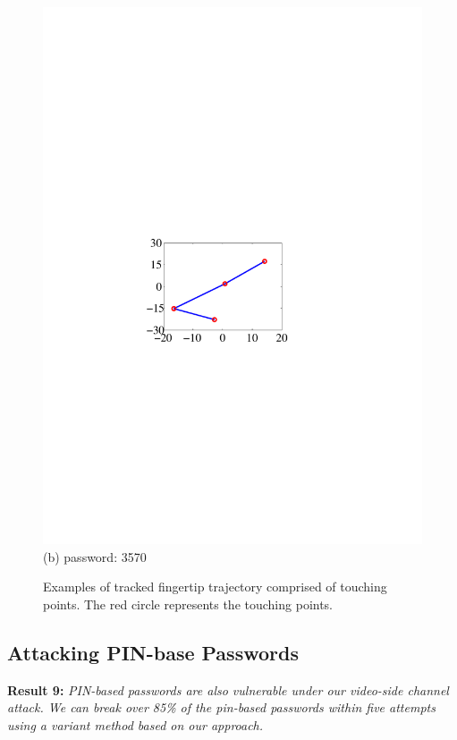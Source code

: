 \begin{figure}[!t]
{\begin{minipage}[t]{0.22\textwidth}
                \includegraphics[width=\textwidth]{fig/pin_3570.pdf}\\
                \centering  (b) password: 3570
             \end{minipage}
        }
        \caption{Examples of tracked fingertip trajectory comprised of touching points. The red circle represents the touching points.}
        \label{fig:pins_trajectory}
    \end{figure}

    \subsection{Attacking PIN-base Passwords}
    \label{section: attacking-pin-passwords}
        \noindent \textbf{Result 9:} \emph{PIN-based passwords are also
        vulnerable under our video-side channel attack. We can break
        over 85\% of the pin-based passwords within five attempts using a
        variant method based on our approach.}

